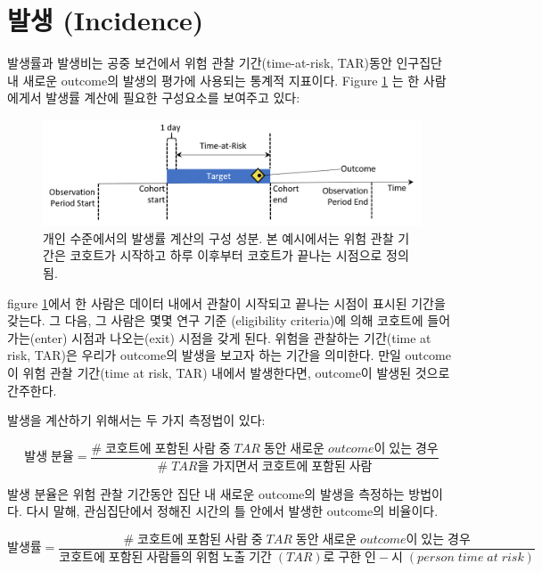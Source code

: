 \documentclass[11pt]{book}
\theoremstyle{definition}
\theoremstyle{definition}
\theoremstyle{definition}
\theoremstyle{remark}
\begin{document}
\section{발생 (Incidence)}\label{-incidence}

발생률과 발생비는 공중 보건에서 위험 관찰 기간(time-at-risk, TAR)동안
인구집단 내 새로운 outcome의 발생의 평가에 사용되는 통계적 지표이다.
Figure \ref{fig:incidenceTimeline} 는 한 사람에게서 발생률 계산에 필요한
구성요소를 보여주고 있다: 

\begin{figure}

{\centering \includegraphics[width=1\linewidth]{images/Characterization/incidenceTimeline} 

}

\caption{개인 수준에서의 발생률 계산의 구성 성분. 본 예시에서는 위험 관찰 기간은 코호트가 시작하고 하루 이후부터 코호트가 끝나는 시점으로 정의됨.}\label{fig:incidenceTimeline}
\end{figure}

figure \ref{fig:incidenceTimeline}에서 한 사람은 데이터 내에서 관찰이
시작되고 끝나는 시점이 표시된 기간을 갖는다. 그 다음, 그 사람은 몇몇
연구 기준 (eligibility criteria)에 의해 코호트에 들어가는(enter) 시점과
나오는(exit) 시점을 갖게 된다. 위험을 관찰하는 기간(time at risk, TAR)은
우리가 outcome의 발생을 보고자 하는 기간을 의미한다. 만일 outcome이 위험
관찰 기간(time at risk, TAR) 내에서 발생한다면, outcome이 발생된 것으로
간주한다.

발생을 계산하기 위해서는 두 가지 측정법이 있다:

\[ 
발생\;분율 = \frac{\#\;코호트에\;포함된\;사람\;중\;TAR\;동안\;새로운\;outcome이\;있는\;경우}{\#\;TAR을\;가지면서\;코호트에\;포함된\;사람}
\]

발생 분율은 위험 관찰 기간동안 집단 내 새로운 outcome의 발생을 측정하는
방법이다. 다시 말해, 관심집단에서 정해진 시간의 틀 안에서 발생한
outcome의 비율이다. 

\[
발생률 = \frac{\#\;코호트에\;포함된\;사람\;중\;TAR\;동안\;새로운\;outcome이\;있는\;경우}{코호트에\;포함된\;사람들의\;위험\;노출\;기간\;(TAR)로\;구한\;인-시\;(person\;time\;at\;risk)}
\]
\end{document}
